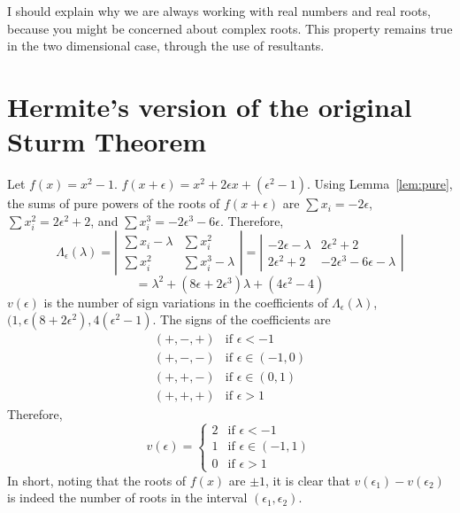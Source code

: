 I should explain why we are always working with real numbers and real roots, 
because you might be concerned about complex roots.
This property remains true in the two dimensional case, through the use of resultants.

\section{Hermite's version of the original Sturm Theorem}

\begin{example}
Let $f(x) = x^{2} - 1$.
$f(x+\epsilon) = x^{2} + 2\epsilon x + (\epsilon^{2} - 1)$.
Using Lemma~\ref{lem:pure}, the sums of pure powers of the roots of $f(x+\epsilon)$ are
$\sum x_{i} = -2\epsilon$, 
$\sum x_{i}^{2} = 2\epsilon^{2} + 2$, and 
$\sum x_{i}^{3} =-2\epsilon^{3} - 6\epsilon$.
Therefore, 
\[ \Lambda_{\epsilon}(\lambda) = \left| \begin{array}{ll}
	\sum x_{i} - \lambda    &   \sum x_{i}^{2}  \\
	\sum x_{i}^{2}		&   \sum x_{i}^{3} - \lambda
	\end{array} \right| = 
			\left| \begin{array}{ll}
	-2\epsilon - \lambda    &  2\epsilon^{2} + 2 \\
	2\epsilon^{2} + 2 	&  -2\epsilon^{3} - 6\epsilon - \lambda
	\end{array} \right|
\]
\[	= \lambda^{2} + (8\epsilon + 2\epsilon^{3})\lambda + (4\epsilon^{2} - 4) 
\]
$v(\epsilon)$ is the number of sign variations in the coefficients of 
$\Lambda_{\epsilon}(\lambda)$, $(1,\epsilon(8+2\epsilon^{2}),4(\epsilon^{2} - 1)$.
The signs of the coefficients are 
\[
\begin{array}{ll}
	(+,-,+)  	& \mbox{if $\epsilon < -1$} \\
	(+,-,-)  	& \mbox{if $\epsilon \in (-1,0)$} \\
	(+,+,-)  	& \mbox{if $\epsilon \in (0,1)$} \\
	(+,+,+)  	& \mbox{if $\epsilon > 1$}
\end{array}
\]
Therefore, 
\[ v(\epsilon) = \left\{
\begin{array}{ll}
	2  	& \mbox{if $\epsilon < -1$} \\
	1  	& \mbox{if $\epsilon \in (-1,1)$} \\
	0  	& \mbox{if $\epsilon > 1$}
\end{array} \right.
\]
In short, noting that the roots of $f(x)$ are $\pm 1$, 
it is clear that $v(\epsilon_{1}) - v(\epsilon_{2})$ is indeed the number
of roots in the interval $(\epsilon_{1}, \epsilon_{2})$.
\end{example}


